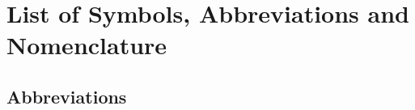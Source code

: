 \documentclass[12pt,a4paper]{article}
\begin{document}
\clearpage

\renewcommand{\cfttabpresnum}{Table }
\renewcommand{\cfttabnumwidth}{5em}
\renewcommand{\listtablename}{LIST OF TABLES} %


\listoftables
\thispagestyle{plain}


\clearpage

\renewcommand{\cftfigpresnum}{Figure }
\renewcommand{\cftfignumwidth}{5.5em}
\renewcommand{\listfigurename}{LIST OF FIGURES} %


\listoffigures
\thispagestyle{plain}


\clearpage

\section*{List of Symbols, Abbreviations and Nomenclature}

\subsection*{Abbreviations}
\end{document}
